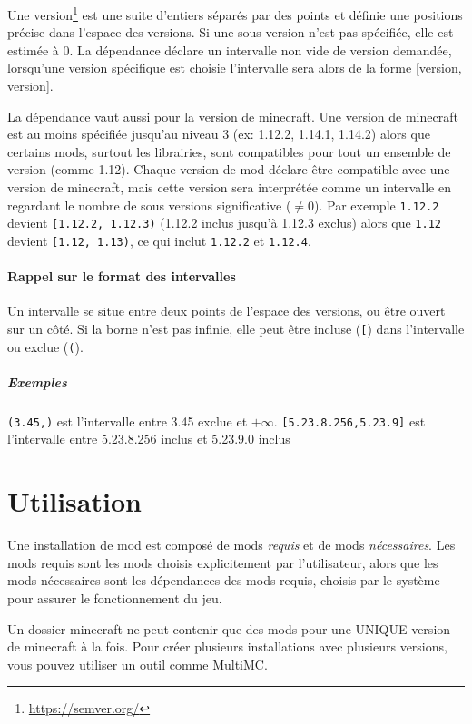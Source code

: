 \documentclass{article}
\begin{document}
Une version\footnote{\url{https://semver.org/}} est une suite d'entiers séparés par des points et définie une positions précise dans l'espace des versions.
Si une sous-version n'est pas spécifiée, elle est estimée à 0.
La dépendance déclare un intervalle non vide de version demandée, lorsqu'une version spécifique est choisie l'intervalle sera alors de la forme [version, version].

La dépendance vaut aussi pour la version de minecraft.
Une version de minecraft est au moins spécifiée jusqu'au niveau 3 (ex: 1.12.2, 1.14.1, 1.14.2) alors que certains mods, surtout les librairies, sont compatibles pour tout un ensemble de version (comme 1.12).
Chaque version de mod déclare être compatible avec une version de minecraft, mais cette version sera interprétée comme un intervalle en regardant le nombre de sous versions significative ($\neq 0$).
Par exemple \verb|1.12.2| devient \verb|[1.12.2, 1.12.3)| (1.12.2 inclus jusqu'à 1.12.3 exclus) alors que \verb|1.12| devient \verb|[1.12, 1.13)|, ce qui inclut \verb|1.12.2| et \verb|1.12.4|.

\paragraph{Rappel sur le format des intervalles}
Un intervalle se situe entre deux points de l'espace des versions, ou être ouvert sur un côté.
Si la borne n'est pas infinie, elle peut être incluse (\verb|[|) dans l'intervalle ou exclue (\verb|(|).
\subparagraph{Exemples}
\verb|(3.45,)| est l'intervalle entre 3.45 exclue et $+\infty$.
\verb|[5.23.8.256,5.23.9]| est l'intervalle entre 5.23.8.256 inclus et 5.23.9.0 inclus

%
%
\section{Utilisation}
\label{section:utilisation}
Une installation de mod est composé de mods \textit{requis} et de mods \textit{nécessaires}.
Les mods requis sont les mods choisis explicitement par l'utilisateur, alors que les mods nécessaires sont les dépendances des mods requis, choisis par le système pour assurer le fonctionnement du jeu.

Un dossier minecraft ne peut contenir que des mods pour une UNIQUE version de minecraft à la fois.
Pour créer plusieurs installations avec plusieurs versions, vous pouvez utiliser un outil comme MultiMC. %
\end{document}
